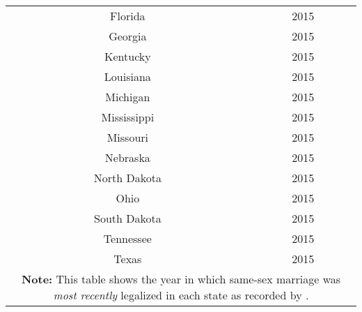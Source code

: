 \begin{spacing}{1}
\begin{longtable}{|c|c|}
Florida & 2015 \\
Georgia & 2015 \\
Kentucky & 2015 \\
Louisiana & 2015 \\
Michigan & 2015 \\
Mississippi & 2015 \\
Missouri & 2015 \\
Nebraska & 2015 \\
North Dakota & 2015 \\
Ohio & 2015 \\
South Dakota & 2015 \\
Tennessee & 2015 \\
Texas & 2015 \\
\hline
\multicolumn{2}{p{0.8\linewidth}}{\small \textbf{Note:} This table shows the year in which same-sex marriage was \textit{most recently} legalized in each state as recorded by \citet{27}.} \\ 
\end{longtable}
\end{spacing}

